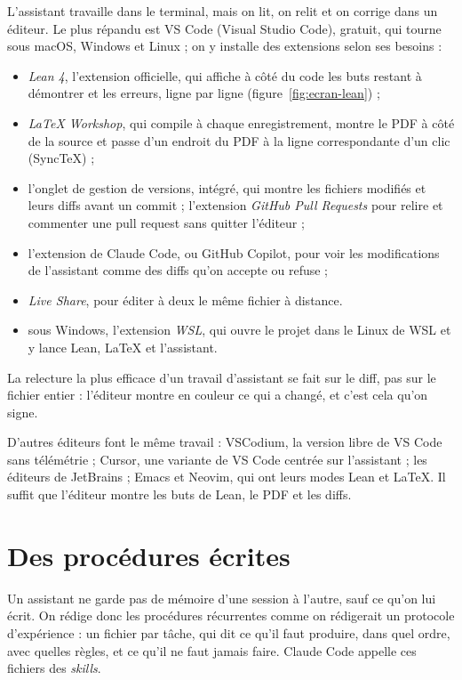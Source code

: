 L'assistant travaille dans le terminal, mais on lit, on relit et on corrige dans un
éditeur. Le plus répandu est VS Code (Visual Studio Code), gratuit, qui tourne sous macOS,
Windows et Linux ; on y installe des extensions selon ses besoins :
\begin{itemize}
  \item \emph{Lean 4}, l'extension officielle, qui affiche à côté du code les buts restant à
        démontrer et les erreurs, ligne par ligne (figure~\ref{fig:ecran-lean}) ;
  \item \emph{LaTeX Workshop}, qui compile à chaque enregistrement, montre le PDF à côté
        de la source et passe d'un endroit du PDF à la ligne correspondante d'un clic
        (SyncTeX) ;
  \item l'onglet de gestion de versions, intégré, qui montre les fichiers modifiés et
        leurs diffs avant un commit ; l'extension \emph{GitHub Pull Requests} pour relire
        et commenter une pull request sans quitter l'éditeur ;
  \item l'extension de Claude Code, ou GitHub Copilot, pour voir les modifications de
        l'assistant comme des diffs qu'on accepte ou refuse ;
  \item \emph{Live Share}, pour éditer à deux le même fichier à distance.
  \item sous Windows, l'extension \emph{WSL}, qui ouvre le projet dans le Linux de WSL
        et y lance Lean, LaTeX et l'assistant.
\end{itemize}

\begin{tipblock}
La relecture la plus efficace d'un travail d'assistant se fait sur le diff, pas sur le
fichier entier : l'éditeur montre en couleur ce qui a changé, et c'est cela qu'on signe.
\end{tipblock}

D'autres éditeurs font le même travail : VSCodium, la version libre de VS Code sans
télémétrie ; Cursor, une variante de VS Code centrée sur l'assistant ; les éditeurs de
JetBrains ; Emacs et Neovim, qui ont leurs modes Lean et LaTeX. Il suffit que
l'éditeur montre les buts de Lean, le PDF et les diffs.

\section{Des procédures écrites}

Un assistant ne garde pas de mémoire d'une session à l'autre, sauf ce qu'on lui écrit. On
rédige donc les procédures récurrentes comme on rédigerait un protocole d'expérience : un
fichier par tâche, qui dit ce qu'il faut produire, dans quel ordre, avec quelles règles,
et ce qu'il ne faut jamais faire. Claude Code appelle ces fichiers des \emph{skills}.

